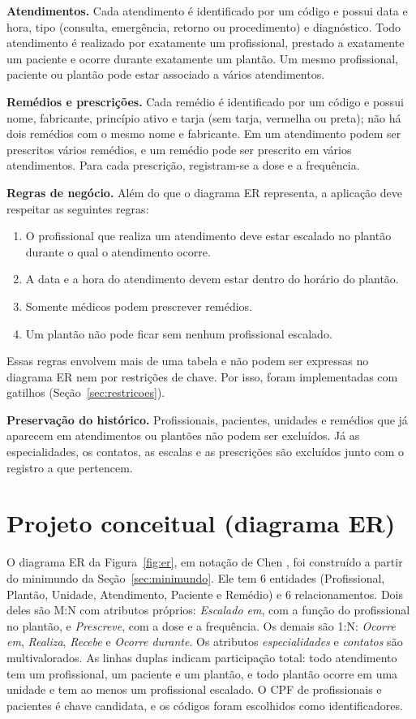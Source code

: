 \documentclass[10pt,a4paper]{article}
\begin{document}
\textbf{Atendimentos.} Cada atendimento é identificado por um código e possui data e hora, tipo (consulta, emergência, retorno ou procedimento) e diagnóstico. Todo atendimento é realizado por exatamente um profissional, prestado a exatamente um paciente e ocorre durante exatamente um plantão. Um mesmo profissional, paciente ou plantão pode estar associado a vários atendimentos.

\textbf{Remédios e prescrições.} Cada remédio é identificado por um código e possui nome, fabricante, princípio ativo e tarja (sem tarja, vermelha ou preta); não há dois remédios com o mesmo nome e fabricante. Em um atendimento podem ser prescritos vários remédios, e um remédio pode ser prescrito em vários atendimentos. Para cada prescrição, registram-se a dose e a frequência.

\textbf{Regras de negócio.} Além do que o diagrama ER representa, a aplicação deve respeitar as seguintes regras:
\begin{enumerate}[label=\textbf{R\arabic*.}]
  \item O profissional que realiza um atendimento deve estar escalado no plantão durante o qual o atendimento ocorre.
  \item A data e a hora do atendimento devem estar dentro do horário do plantão.
  \item Somente médicos podem prescrever remédios.
  \item Um plantão não pode ficar sem nenhum profissional escalado.
\end{enumerate}
Essas regras envolvem mais de uma tabela e não podem ser expressas no diagrama ER nem por restrições de chave. Por isso, foram implementadas com gatilhos \cite{mysql-trigger} (Seção~\ref{sec:restricoes}).

\textbf{Preservação do histórico.} Profissionais, pacientes, unidades e remédios que já aparecem em atendimentos ou plantões não podem ser excluídos. Já as especialidades, os contatos, as escalas e as prescrições são excluídos junto com o registro a que pertencem.
\section{Projeto conceitual (diagrama ER)}\label{sec:er}

O diagrama ER da Figura~\ref{fig:er}, em notação de Chen \cite{elmasri}, foi construído a partir do minimundo da Seção~\ref{sec:minimundo}. Ele tem 6 entidades (Profissional, Plantão, Unidade, Atendimento, Paciente e Remédio) e 6 relacionamentos. Dois deles são M:N com atributos próprios: \emph{Escalado em}, com a função do profissional no plantão, e \emph{Prescreve}, com a dose e a frequência. Os demais são 1:N: \emph{Ocorre em}, \emph{Realiza}, \emph{Recebe} e \emph{Ocorre durante}. Os atributos \emph{especialidades} e \emph{contatos} são multivalorados. As linhas duplas indicam participação total: todo atendimento tem um profissional, um paciente e um plantão, e todo plantão ocorre em uma unidade e tem ao menos um profissional escalado. O CPF de profissionais e pacientes é chave candidata, e os códigos foram escolhidos como identificadores.
\end{document}
